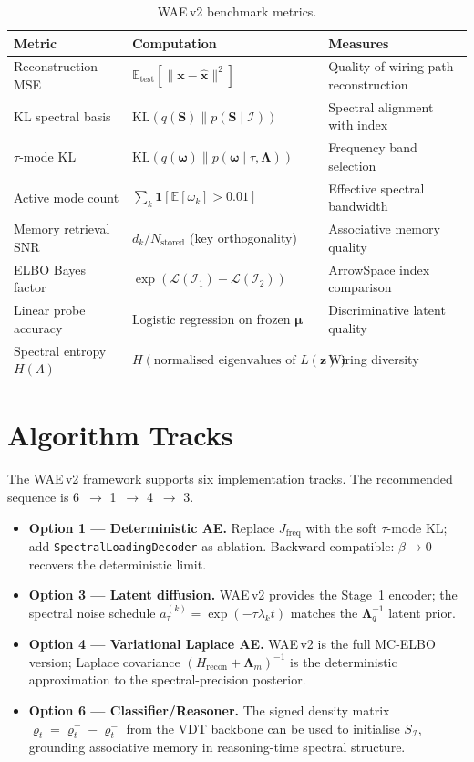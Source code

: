\documentclass[11pt,a4paper]{article}
\newcommand{\E}{\mathbb{E}}
\newcommand{\KL}{\mathrm{KL}}
\newcommand{\I}{\mathcal{I}}
\newcommand{\elbo}{\mathcal{L}}
\newcommand{\bLambda}{\bm{\Lambda}}
\newcommand{\bS}{\bm{S}}
\newcommand{\bz}{\bm{z}}
\newcommand{\bmu}{\bm{\mu}}
\newcommand{\bomega}{\bm{\omega}}
\newcommand{\bx}{\bm{x}}
\begin{document}
\begin{table}[h]
\centering
\caption{WAE\,v2 benchmark metrics.}
\label{tab:metrics}
\begin{tabular}{@{}lll@{}}
\toprule
Metric & Computation & Measures \\
\midrule
Reconstruction MSE & $\E_\text{test}[\|\bx-\hat{\bx}\|^2]$ & Quality of wiring-path reconstruction \\
KL spectral basis & $\KL(q(\bS)\|p(\bS\mid\I))$ & Spectral alignment with index \\
$\tau$-mode KL & $\KL(q(\bomega)\|p(\bomega\mid\tau,\bLambda))$ & Frequency band selection \\
Active mode count & $\sum_k \mathbf{1}[\E[\omega_k]>0.01]$ & Effective spectral bandwidth \\
Memory retrieval SNR & $d_k / N_{\mathrm{stored}}$ (key orthogonality) & Associative memory quality \\
ELBO Bayes factor & $\exp(\elbo(\I_1)-\elbo(\I_2))$ & ArrowSpace index comparison \\
Linear probe accuracy & Logistic regression on frozen $\bmu$ & Discriminative latent quality \\
Spectral entropy $H(\Lambda)$ & $H(\text{normalised eigenvalues of }L(\bz))$ & Wiring diversity \\
\bottomrule
\end{tabular}
\end{table}

\section{Algorithm Tracks}
\label{sec:tracks}

The WAE\,v2 framework supports six implementation tracks.  The recommended
sequence is 6~$\to$ 1~$\to$ 4~$\to$ 3.

\begin{itemize}
  \item \textbf{Option 1 --- Deterministic AE.}  Replace $J_{\mathrm{freq}}$
        with the soft $\tau$-mode KL; add \texttt{SpectralLoadingDecoder} as
        ablation.  Backward-compatible: $\beta\to 0$ recovers the deterministic
        limit.
  \item \textbf{Option 3 --- Latent diffusion.}  WAE\,v2 provides the Stage~1
        encoder; the spectral noise schedule
        $a_\tau^{(k)}=\exp(-\tau\lambda_k t)$ matches the $\bLambda_q^{-1}$
        latent prior.
  \item \textbf{Option 4 --- Variational Laplace AE.}  WAE\,v2 is the full
        MC-ELBO version; Laplace covariance
        $(H_{\mathrm{recon}}+\bLambda_m)^{-1}$ is the deterministic
        approximation to the spectral-precision posterior.
  \item \textbf{Option 6 --- Classifier/Reasoner.}  The signed density matrix
        $\varrho_t=\varrho_t^+-\varrho_t^-$ from the VDT backbone can be used
        to initialise $S_{\I}$, grounding associative memory in
        reasoning-time spectral structure.
\end{itemize}
\end{document}
